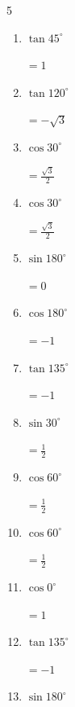 \begin{multicols}{5}
\begin{enumerate}
        $\displaystyle =\frac{1}{\sqrt{3}}$

  \item $\displaystyle \tan{45^\circ}$

        $\displaystyle =1$

  \item $\displaystyle \tan{120^\circ}$

        $\displaystyle =-\sqrt{3}$

  \item $\displaystyle \cos{30^\circ}$

        $\displaystyle =\frac{\sqrt{3}}{2}$

  \item $\displaystyle \cos{30^\circ}$

        $\displaystyle =\frac{\sqrt{3}}{2}$

  \item $\displaystyle \sin{180^\circ}$

        $\displaystyle =0$

  \item $\displaystyle \cos{180^\circ}$

        $\displaystyle =-1$

  \item $\displaystyle \tan{135^\circ}$

        $\displaystyle =-1$

  \item $\displaystyle \sin{30^\circ}$

        $\displaystyle =\frac{1}{2}$

  \item $\displaystyle \cos{60^\circ}$

        $\displaystyle =\frac{1}{2}$

  \item $\displaystyle \cos{60^\circ}$

        $\displaystyle =\frac{1}{2}$

  \item $\displaystyle \cos{0^\circ}$

        $\displaystyle =1$

\columnbreak %

  \item $\displaystyle \tan{135^\circ}$

        $\displaystyle =-1$

  \item $\displaystyle \sin{180^\circ}$


\end{enumerate}
\end{multicols}
